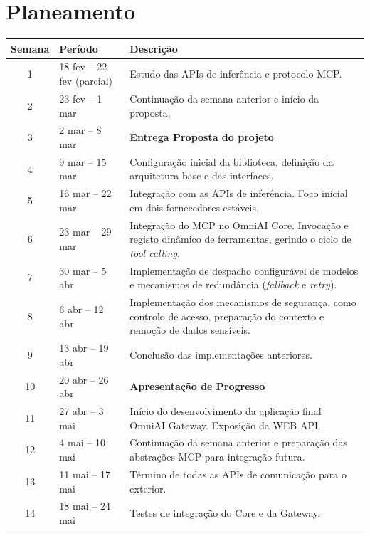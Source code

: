 \documentclass[11pt,a4paper]{report}
\begin{document}
    \section{Planeamento}
    \begin{table}[H]
        \centering
        \footnotesize
        \renewcommand{\arraystretch}{1.2}
        \begin{tabular}{|c|l|p{11.0cm}|}
            \hline
            \textbf{Semana} & \textbf{Período} & \textbf{Descrição} \\
            \hline
            1 & 18 fev -- 22 fev (parcial) & Estudo das APIs de inferência e protocolo MCP. \\
            2 & 23 fev -- 1 mar & Continuação da semana anterior e início da proposta. \\
            3 & 2 mar -- 8 mar & \textbf{Entrega Proposta do projeto} \\
            4 & 9 mar -- 15 mar & Configuração inicial da biblioteca, definição da arquitetura base e das interfaces. \\
            5 & 16 mar -- 22 mar & Integração com as APIs de inferência. Foco inicial em dois fornecedores estáveis. \\
            6 & 23 mar -- 29 mar & Integração do MCP no OmniAI Core. Invocação e registo dinâmico de ferramentas, gerindo o ciclo de \textit{tool calling}. \\
            7 & 30 mar -- 5 abr & Implementação de despacho configurável de modelos e mecanismos de redundância (\textit{fallback} e \textit{retry}). \\
            8 & 6 abr -- 12 abr & Implementação dos mecanismos de segurança, como controlo de acesso, preparação do contexto e remoção de dados sensíveis. \\
            9 & 13 abr -- 19 abr & Conclusão das implementações anteriores. \\
            10 & 20 abr -- 26 abr & \textbf{Apresentação de Progresso} \\
            11 & 27 abr -- 3 mai & Início do desenvolvimento da aplicação final OmniAI Gateway. Exposição da WEB API. \\
            12 & 4 mai -- 10 mai & Continuação da semana anterior e preparação das abstrações MCP para integração futura. \\
            13 & 11 mai -- 17 mai & Término de todas as APIs de comunicação para o exterior. \\
            14 & 18 mai -- 24 mai & Testes de integração do Core e da Gateway. \\

\end{tabular}
\end{table}
\end{document}

